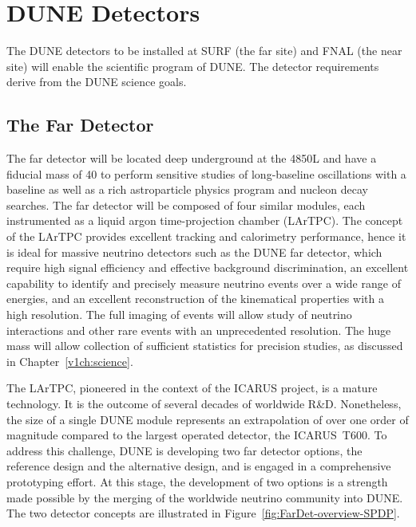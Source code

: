 \section{DUNE Detectors}

The DUNE detectors to be installed at SURF (the far site) and FNAL (the near site) will enable the scientific program of DUNE.  The detector 
requirements derive from the DUNE science goals.

\subsection{The Far Detector}
The  far detector will be located deep underground at the 4850L and have
a  fiducial mass of \SI{40}{\kt} to perform sensitive studies of long-baseline oscillations with a  baseline as well as a rich astroparticle physics program and nucleon decay searches. The far detector  will be composed of four %
similar modules, each instrumented as a liquid argon time-projection chamber (LArTPC).
The concept of the LArTPC provides
excellent tracking and calorimetry performance, hence it is ideal for massive neutrino detectors such as the DUNE far detector, which require high signal efficiency and effective background discrimination,  an excellent capability to identify and  precisely measure neutrino events over a wide range of energies, and an excellent reconstruction of the kinematical properties
with a high resolution. The full imaging of events will allow study of neutrino interactions and
other rare events with an unprecedented resolution.
 The huge mass will allow collection of sufficient statistics for precision
studies, as discussed in Chapter~\ref{v1ch:science}.

The LArTPC, pioneered in the context of the ICARUS project, is a mature technology. It is the outcome
of several decades of worldwide R\&D.  Nonetheless, the size of a single  DUNE module represents an extrapolation of over one order of magnitude compared to the largest operated detector, the ICARUS~T600. To address this challenge, DUNE is developing two far detector options, the reference design and the alternative design, and is engaged in a 
comprehensive prototyping effort. At this stage, the development of two options is a strength %
made possible by the merging of the worldwide neutrino community into DUNE.  The two detector
concepts are illustrated in Figure~\ref{fig:FarDet-overview-SPDP}.

